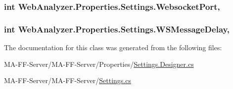 \subsubsection[{Websocket\+Port}]{\setlength{\rightskip}{0pt plus 5cm}int Web\+Analyzer.\+Properties.\+Settings.\+Websocket\+Port\hspace{0.3cm}{\ttfamily [get]}, {\ttfamily [set]}}\label{class_web_analyzer_1_1_properties_1_1_settings_ab28fb58a6d2cf2841c86966c406a4ab3}
\hypertarget{class_web_analyzer_1_1_properties_1_1_settings_a62b7526a2c670219322da46a41f2ed4b}{}
\subsubsection[{W\+S\+Message\+Delay}]{\setlength{\rightskip}{0pt plus 5cm}int Web\+Analyzer.\+Properties.\+Settings.\+W\+S\+Message\+Delay\hspace{0.3cm}{\ttfamily [get]}, {\ttfamily [set]}}\label{class_web_analyzer_1_1_properties_1_1_settings_a62b7526a2c670219322da46a41f2ed4b}


The documentation for this class was generated from the following files\+:\begin{DoxyCompactItemize}
\item 
M\+A-\/\+F\+F-\/\+Server/\+M\+A-\/\+F\+F-\/\+Server/\+Properties/\hyperlink{_settings_8_designer_8cs}{Settings.\+Designer.\+cs}\item 
M\+A-\/\+F\+F-\/\+Server/\+M\+A-\/\+F\+F-\/\+Server/\hyperlink{_settings_8cs}{Settings.\+cs}\end{DoxyCompactItemize}
